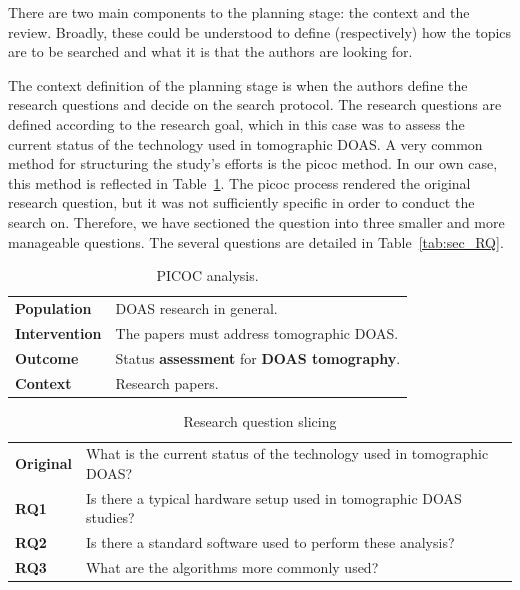 There are two main components to the planning stage: the context and the
review. Broadly, these could be understood to define (respectively) how
the topics are to be searched and what it is that the authors are
looking for.

The context definition of the planning stage is when the authors define
the research questions and decide on the search protocol. The research
questions are defined according to the research goal, which in this case
was to assess the current status of the technology used in tomographic
\gls{DOAS}. A very common method for structuring the study's efforts is
the \gls{picoc} method. In our own case, this method is reflected in
Table~\ref{tab:picoc_sms}. The \gls{picoc} process rendered the original
research question, but it was not sufficiently specific in order to
conduct the search on. Therefore, we have sectioned the question into
three smaller and more manageable questions. The several questions are
detailed in Table~\ref{tab:sec_RQ}.

\begin{table}[htb]
\small
\centering
\caption{PICOC analysis.}
\label{tab:picoc_sms}
\begin{tabular}{@{}ll@{}}
\toprule
\textbf{Population} & DOAS research in general.\\
\textbf{Intervention} & The papers must address tomographic DOAS.\\
\textbf{Outcome} & Status \textbf{assessment} for \textbf{DOAS tomography}.\\
\textbf{Context} & Research papers.\\\bottomrule
\end{tabular}
\end{table}

\begin{table}[htb]
\centering
\small
\caption{Research question slicing}
\label{tab:rq_slicing}
    \begin{tabularx}{\textwidth}{lX}
        \toprule
        \textbf{Original} & What is the current status of the technology used in
        tomographic DOAS? \\
        \textbf{RQ1} & Is there a typical hardware setup used in tomographic
        DOAS studies? \\
        \textbf{RQ2} & Is there a standard software used to perform these
        analysis? \\
        \textbf{RQ3} & What are the algorithms more commonly used?\\\bottomrule
    \end{tabularx}
\end{table}

